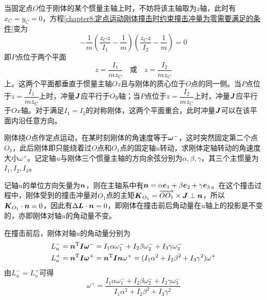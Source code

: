当固定点$O$位于刚体的某个惯量主轴上时，不妨将该主轴取为$z$轴，此时有$x_C=y_C=0$，方程\eqref{chapter8:定点运动刚体撞击时约束撞击冲量为零需要满足的条件}变为
\begin{equation*}
	-\frac1m \left(\frac{z_Cz}{I_1}-\frac1m\right) \left(\frac{z_Cz}{I_2}-\frac1m\right) = 0
\end{equation*}
即$P$点位于两个平面
\begin{equation*}
	z = \frac{I_1}{mz_C}\quad \text{或}\quad z = \frac{I_2}{mz_C}
\end{equation*}
上。这两个平面都垂直于惯量主轴$Oz$且与刚体的质心位于$O$点的同一侧。当$P$点位于$z = \dfrac{I_1}{mz_C}$上时，冲量$\boldsymbol{J}$应平行于$Oy$轴；当$P$点位于$z = \dfrac{I_2}{mz_C}$上时，冲量$\boldsymbol{J}$应平行于$Ox$轴。对于满足$I_1=I_2$的对称刚体，这两个平面重合，此时冲量$\boldsymbol{J}$可以在该平面内沿任意方向。

\begin{example}\label{chapter8:定点转动刚体的碰撞例1}
刚体绕$O$点作定点运动，在某时刻刚体的角速度等于$\boldsymbol{\omega}^-$，这时突然固定第二个点$O_1$，此后刚体即只能绕着过$O$点和$O_1$点的固定轴$u$转动，求刚体定轴转动的角速度大小$\omega^+$。记定轴$u$与刚体三个惯量主轴的方向余弦分别为$\alpha, \beta, \gamma$，其三个主惯量为$I_1,I_2,I_3$。
\end{example}

\begin{solution}
记轴$u$的单位方向矢量为$\boldsymbol{n}$，则在主轴系中有$\boldsymbol{n}=\alpha\boldsymbol{e}_1+\beta\boldsymbol{e}_2+\gamma\boldsymbol{e}_3$。在这个撞击过程中，刚体受到的撞击冲量对$O_1$点的主矩$\boldsymbol{K}_{O_1} = \overrightarrow{OO_1}\times \boldsymbol{J} \perp \boldsymbol{n}$，所以$\boldsymbol{K}_{O_1}\cdot \boldsymbol{n}=0$，因此有$\Delta \boldsymbol{L}\cdot \boldsymbol{n}=0$，即刚体在撞击前后角动量在$u$轴上的投影是不变的，亦即刚体对轴$u$的角动量不变。

在撞击前后，刚体对轴$u$的角动量分别为
\begin{align*}
	L_u^- & = \boldsymbol{n}^{\mathrm{T}}\boldsymbol{I}\boldsymbol{\omega}^- = I_1\alpha\omega_1^-+I_2\beta\omega_2^-+I_3\gamma\omega_3^- \\
	L_u^+ & = \boldsymbol{n}^{\mathrm{T}}\boldsymbol{I}\boldsymbol{\omega}^+ = \boldsymbol{n}^{\mathrm{T}}\boldsymbol{I}\boldsymbol{n}\omega^+ = (I_1\alpha^2+I_2\beta^2+I_3\gamma^2)\omega^+
\end{align*}
由$L_u^-=L_u^+$可得
\begin{equation*}
	\omega^+ = \frac{I_1\alpha\omega_1^-+I_2\beta\omega_2^-+I_3\gamma\omega_3^-}{I_1\alpha^2+I_2\beta^2+I_3\gamma^2}
\end{equation*}
\end{solution}

